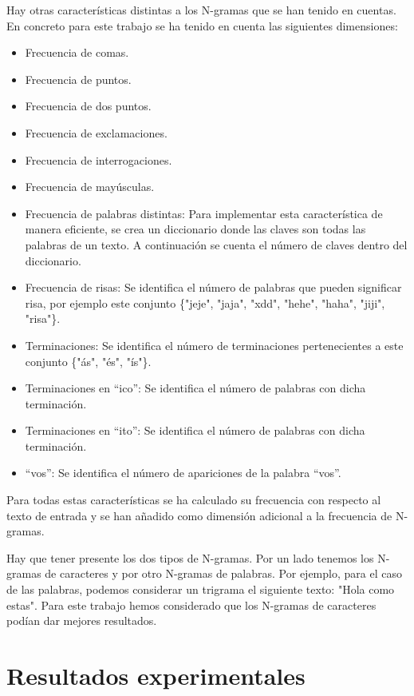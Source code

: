 \documentclass[11pt,a4paper]{article}
\begin{document}
Hay otras características distintas a los N-gramas que se han tenido en cuentas. En concreto para este trabajo se ha tenido en cuenta las siguientes dimensiones:
\begin{itemize}
\item Frecuencia de comas.
\item Frecuencia de puntos.
\item Frecuencia de dos puntos.
\item Frecuencia de exclamaciones.
\item Frecuencia de interrogaciones.
\item Frecuencia de mayúsculas.
\item Frecuencia de palabras distintas: Para implementar esta característica de manera eficiente, se crea un diccionario donde las claves son todas las palabras de un texto. A continuación se cuenta el número de claves dentro del diccionario.
\item Frecuencia de risas: Se identifica el número de palabras que pueden significar risa, por ejemplo este conjunto \{"jeje", "jaja", "xdd", "hehe", "haha", "jiji", "risa"\}.
\item Terminaciones: Se identifica el número de terminaciones pertenecientes a este conjunto \{"ás", "és", "ís"\}.
\item Terminaciones en ``ico'': Se identifica el número de palabras con dicha terminación.
\item Terminaciones en ``ito'': Se identifica el número de palabras con dicha terminación.
\item ``vos'': Se identifica el número de apariciones de la palabra ``vos''.
\end{itemize}

Para todas estas características se ha calculado su frecuencia con respecto al texto de entrada y se han añadido como dimensión adicional a la frecuencia de N-gramas.

Hay que tener presente los dos tipos de N-gramas. Por un lado tenemos los N-gramas de caracteres y por otro N-gramas de palabras. Por ejemplo, para el caso de las palabras, podemos considerar un trigrama el siguiente texto: "Hola como estas". Para este trabajo hemos considerado que los N-gramas de caracteres podían dar mejores resultados.

\section{Resultados experimentales}
\end{document}
